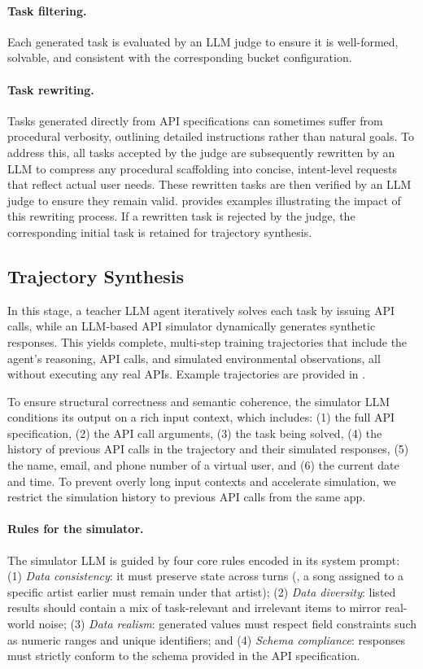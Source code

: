 \paragraph{Task filtering.} Each generated task is evaluated by an LLM judge to ensure it is well-formed, solvable, and consistent with the corresponding bucket configuration.

\paragraph{Task rewriting.} Tasks generated directly from API specifications can sometimes suffer from procedural verbosity, outlining detailed instructions rather than natural goals. To address this, all tasks accepted by the judge are subsequently rewritten by an LLM to compress any procedural scaffolding into concise, intent-level requests that reflect actual user needs. These rewritten tasks are then verified by an LLM judge to ensure they remain valid.  provides examples illustrating the impact of this rewriting process. If a rewritten task is rejected by the judge, the corresponding initial task is retained for trajectory synthesis.

\subsection{Trajectory Synthesis}
In this stage, a teacher LLM agent iteratively solves each task by issuing API calls, while an LLM-based API simulator dynamically generates synthetic responses. This yields complete, multi-step training trajectories that include the agent's reasoning, API calls, and simulated environmental observations, all without executing any real APIs. Example trajectories are provided in .

To ensure structural correctness and semantic coherence, the simulator LLM conditions its output on a rich input context, which includes: (1) the full API specification, (2) the API call arguments, (3) the task being solved, (4) the history of previous API calls in the trajectory and their simulated responses, (5) the name, email, and phone number of a virtual user, and (6) the current date and time. To prevent overly long input contexts and accelerate simulation, we restrict the simulation history to previous API calls from the same app.


\paragraph{Rules for the simulator.} The simulator LLM is guided by four core rules encoded in its system prompt: (1) \emph{Data consistency}: it must preserve state across turns (\eg, a song assigned to a specific artist earlier must remain under that artist); (2) \emph{Data diversity}: listed results should contain a mix of task-relevant and irrelevant items to mirror real-world noise; (3) \emph{Data realism}: generated values must respect field constraints such as numeric ranges and unique identifiers; and (4) \emph{Schema compliance}: responses must strictly conform to the schema provided in the API specification.

